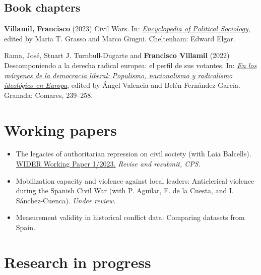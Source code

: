 \documentclass[a4paper, 12pt]{article}
\begin{document}
\subsection*{Book chapters}

\begin{etaremune}[leftmargin=12pt, itemsep=0pt]
\item \textbf{Villamil, Francisco} (2023) Civil Wars. In: \href{https://www.e-elgar.com/shop/gbp/elgar-encyclopedia-of-political-sociology-9781803921228.html}{\textit{Encyclopedia of Political Sociology}}, edited by Maria T. Grasso and Marco Giugni. Cheltenham: Edward Elgar. %
\item Rama, José, Stuart J. Turnbull-Dugarte and \textbf{Francisco Villamil} (2022) Descomponiendo a la derecha radical europea: el perfil de sus votantes. In: \href{https://www.comares.com/libro/en-los-margenes-de-la-democracia-liberal_143816/}{\textit{En los márgenes de la democracia liberal: Populismo, nacionalismo y radicalismo ideológico en Europa}}, edited by Ángel Valencia and Belén Fernández-García. Granada: Comares, 239--258. %
\end{etaremune}

\section*{Working papers}

\begin{itemize}[leftmargin=*, nolistsep]
\item The legacies of authoritarian repression on civil society (with Laia Balcells).\\\href{https://doi.org/10.35188/UNU-WIDER/2023/309-3}{WIDER Working Paper 1/2023.} \textit{Revise and resubmit, CPS.}
\item Mobilization capacity and violence against local leaders: Anticlerical violence during the Spanish Civil War (with P. Aguilar, F. de la Cuesta, and I. Sánchez-Cuenca). \textit{Under review.}
\item Measurement validity in historical conflict data: Comparing datasets from Spain.
\end{itemize}

\section*{Research in progress}
\end{document}
